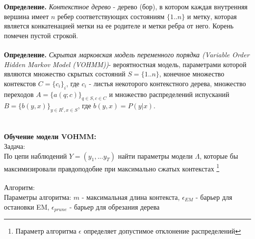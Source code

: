 \documentclass[10pt,a4paper]{article}
\begin{document}
\textbf{Определение.} \textit{Контекстное дерево} - дерево (бор), в котором каждая внутренняя вершина имеет $ n $ ребер соответствующих состояниям $ \{1..n\} $ и метку, которая является конкатенацией метки на ее родителе и метки ребра от него. Корень помечен пустой строкой. 
\\\\
\textbf{Определение.} \textit{Скрытая марковская модель переменного порядка (Variable Order Hidden Markov Model (VOHMM))}- вероятностная модель, параметрами которой являются множество скрытых состояний $ S = \{1..n\} $, конечное множество контекстов $ C=\{c_{i}\}_{i} $, где $ c_{i} $ - листья некоторого контекстного дерева, множество переходов $ A = \{a(q; c)\}_{q \in S, c \in C}$ и множество распределений испусканий $ B = \{b(y,x)\}_{y \in R^{l}, x \in S}$, где $ b(y, x) = P(y|x)$.  
\\\\\\
\textbf{Обучение модели VOHMM:}
\\
{\large Задача:} 
\\
По цепи наблюдений $ Y = (y_{1}, ... y_{T}) $ найти параметры модели $ \Lambda$, 
которые бы максимизировали правдоподобие при максимально сжатых контекстах 
\footnote{Параметр алгоритма $ \epsilon $ определяет допустимое отклонение распределений}
\\\\
{\large Алгоритм:}
\\
Параметры алгоритма: 
$ m $ - максимальная длина контекста, 
$ \epsilon_{EM} $ - барьер для остановки EM,
$ \epsilon_{prune} $ - барьер для обрезания дерева
\\
\end{document}
